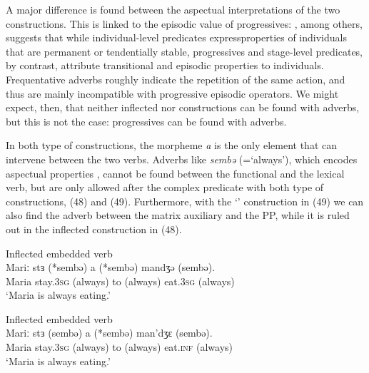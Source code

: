 \documentclass[output=paper]{langsci/langscibook}
\begin{document}
A major difference is found between the aspectual interpretations of the two constructions. This is linked to the episodic value of progressives: \citet{Chierchia1995}, among others, suggests that while individual-level predicates express\linebreak properties of individuals that are permanent or tendentially stable, progressives and stage-level predicates, by contrast, attribute transitional and episodic properties to individuals. Frequentative adverbs roughly indicate the repetition of the same action, and thus are mainly incompatible with progressive episodic operators. We might expect, then, that neither inflected nor  constructions can be found with  adverbs, but this is not the case:  progressives can be found with  adverbs.

In both type of constructions, the morpheme \textit{a} is the only element that can intervene between the two verbs. Adverbs like \textit{sembə} (=‘always’), which encodes  aspectual properties \citep{Cinque1999}, cannot be found between the functional and the lexical verb, but are only allowed after the complex predicate with both type of constructions, (48) and (49). Furthermore, with the ‘’ construction in (49) we can also find the  adverb between the matrix auxiliary and the  PP, while it is ruled out in the inflected construction in (48). 

\ea%
         Inflected embedded verb\label{ex:lorusso:48}\\
    \gll Mariː  stɜ    (*sembə)  a  (*sembə)   mandʒə   (sembə). \\
         Maria  stay.\textsc{3sg} (always)  to   (always)  eat.\textsc{3sg} (always)\\
    \glt ‘Maria is always eating.’
\z


\ea%
         Inflected embedded verb \label{ex:lorusso:49}\\
    \gll Mariː  stɜ     (sembə)   a  (*sembə)  man’dʒɛ  (sembə). \\
         Maria  stay.\textsc{3sg} (always)  to   (always)  eat.\textsc{inf} (always)\\
    \glt ‘Maria is always eating.’
\z
\end{document}
